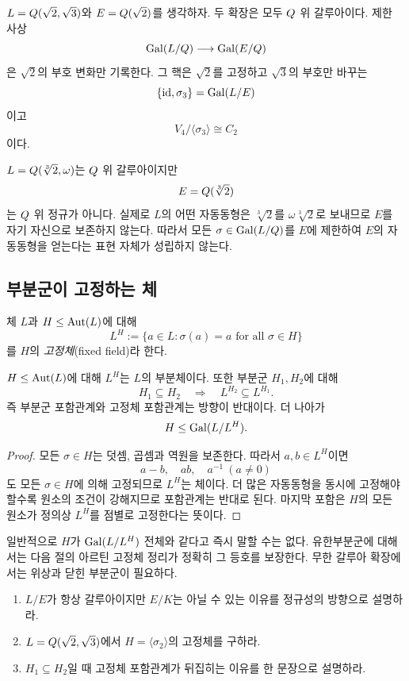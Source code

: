 \begin{example}[이중이차확장의 제한 사상]
$L=Q(\sqrt2,\sqrt3)$와 $E=Q(\sqrt2)$를 생각하자. 두 확장은 모두 $Q$ 위 갈루아이다. 제한 사상
\[
  \operatorname{Gal}(L/Q)\longrightarrow\operatorname{Gal}(E/Q)
\]
은 $\sqrt2$의 부호 변화만 기록한다. 그 핵은 $\sqrt2$를 고정하고 $\sqrt3$의 부호만 바꾸는
\[
  \{\operatorname{id},\sigma_3\}=\operatorname{Gal}(L/E)
\]
이고
\[
  V_4/\langle\sigma_3\rangle\cong C_2
\]
이다.
\end{example}

\begin{pitfall}
$L=Q(\sqrt[3]{2},\omega)$는 $Q$ 위 갈루아이지만
\[
  E=Q(\sqrt[3]{2})
\]
는 $Q$ 위 정규가 아니다. 실제로 $L$의 어떤 자동동형은 $\sqrt[3]{2}$를 $\omega\sqrt[3]{2}$로 보내므로 $E$를 자기 자신으로 보존하지 않는다. 따라서 모든 $\sigma\in\operatorname{Gal}(L/Q)$를 $E$에 제한하여 $E$의 자동동형을 얻는다는 표현 자체가 성립하지 않는다.
\end{pitfall}

\subsection{부분군이 고정하는 체}

\begin{definition}[고정체]
체 $L$과 $H\le\operatorname{Aut}(L)$에 대해
\[
  L^H
  :=\{a\in L:\sigma(a)=a\text{ for all }\sigma\in H\}
\]
를 $H$의 \emph{고정체}(fixed field)라 한다.
\end{definition}

\begin{proposition}
$H\le\operatorname{Aut}(L)$에 대해 $L^H$는 $L$의 부분체이다. 또한 부분군 $H_1,H_2$에 대해
\[
  H_1\subseteq H_2
  \quad\Longrightarrow\quad
  L^{H_2}\subseteq L^{H_1}.
\]
즉 부분군 포함관계와 고정체 포함관계는 방향이 반대이다. 더 나아가
\[
  H\le\operatorname{Gal}(L/L^H).
\]
\end{proposition}

\begin{proof}
모든 $\sigma\in H$는 덧셈, 곱셈과 역원을 보존한다. 따라서 $a,b\in L^H$이면
\[
  a-b,\quad ab,\quad a^{-1}\ (a\ne0)
\]
도 모든 $\sigma\in H$에 의해 고정되므로 $L^H$는 체이다. 더 많은 자동동형을 동시에 고정해야 할수록 원소의 조건이 강해지므로 포함관계는 반대로 된다. 마지막 포함은 $H$의 모든 원소가 정의상 $L^H$를 점별로 고정한다는 뜻이다.
\end{proof}

\begin{remark}
일반적으로 $H$가 $\operatorname{Gal}(L/L^H)$ 전체와 같다고 즉시 말할 수는 없다. 유한부분군에 대해서는 다음 절의 아르틴 고정체 정리가 정확히 그 등호를 보장한다. 무한 갈루아 확장에서는 위상과 닫힌 부분군이 필요하다.
\end{remark}

\begin{checkpoint}
\begin{enumerate}[label=(\alph*)]
  \item $L/E$가 항상 갈루아이지만 $E/K$는 아닐 수 있는 이유를 정규성의 방향으로 설명하라.
  \item $L=Q(\sqrt2,\sqrt3)$에서 $H=\langle\sigma_2\rangle$의 고정체를 구하라.
  \item $H_1\subseteq H_2$일 때 고정체 포함관계가 뒤집히는 이유를 한 문장으로 설명하라.
\end{enumerate}
\end{checkpoint}
